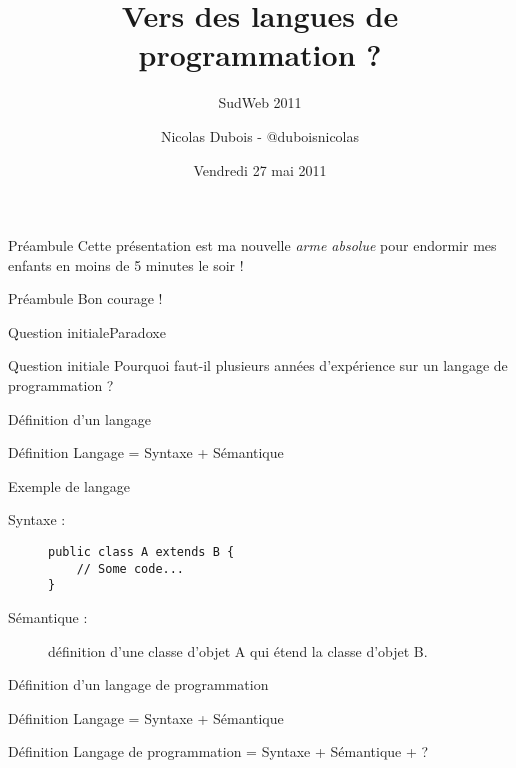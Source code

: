 \documentclass[12pt]{beamer}
\title{Vers des langues de programmation ?}
\subtitle{SudWeb 2011}
\author[Nicolas Dubois]{Nicolas Dubois - @duboisnicolas}
\date{Vendredi 27 mai 2011}
\institute{Lightning Talk}
\begin{document}
\def\tm{\texttrademark}
\def\r{\up{\textregistered}}
\def\sw{SudWeb'11}

\begin{frame}
\titlepage
\end{frame}

\begin{frame}{Préambule}
Cette présentation est ma nouvelle \emph{arme absolue} \pause pour endormir 
mes enfants en moins de \alert{5 minutes} le soir !
\end{frame}

\begin{frame}{Préambule}
Bon courage !
\end{frame}

\begin{frame}{Question initiale}{Paradoxe}
\begin{block}{Question initiale}
Pourquoi faut-il \alert{plusieurs années d'expérience} sur un \alert{langage} de programmation ?
\end{block}
\end{frame}

\begin{frame}[fragile]{Définition d'un langage}
\begin{block}{Définition}
Langage = Syntaxe + Sémantique
\end{block}
\pause
\begin{exampleblock}{Exemple de langage}
\begin{description}
\item[Syntaxe :] 
    \begin{lstlisting}
public class A extends B {
    // Some code...
}
    \end{lstlisting}
    
\item[Sémantique :] définition d'une classe d'objet A qui étend la classe d'objet B.
\end{description}
\end{exampleblock}
\end{frame}

\begin{frame}{Définition d'un langage de programmation}
\begin{block}{Définition}
Langage = Syntaxe + Sémantique
\end{block}
\pause
\begin{block}{Définition}
Langage de programmation = Syntaxe + Sémantique + ?
\end{block}
\end{frame}
\end{document}
